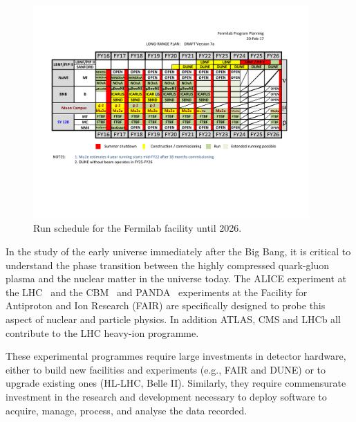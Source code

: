 \begin{figure}
\vspace*{0.3cm}
    \centering
    \includegraphics[width=0.94\textwidth]{10yr-PLAN-9Feb-2017-V7a.pdf}
    \caption{Run schedule for the Fermilab facility until 2026.}
    \label{fig:fnal-if}
\end{figure}

In the study of the early universe immediately after the Big Bang, it is
critical to understand the phase transition between the highly
compressed quark-gluon plasma and the nuclear matter in the universe
today. The ALICE experiment at the LHC~\cite{ALICE} and
the CBM~\cite{CBM} and PANDA~\cite{PANDA} experiments at the Facility for Antiproton and Ion
Research (FAIR) are specifically designed to probe this aspect of
nuclear and particle physics. In addition ATLAS, CMS and LHCb all
contribute to the LHC heavy-ion programme.

These experimental programmes require large investments in detector
hardware, either to build new facilities and experiments (e.g., FAIR and DUNE) or to upgrade existing ones (HL-LHC, Belle II). Similarly, they
require commensurate investment in the research and development
necessary to deploy software to acquire, manage, process, and analyse
the data recorded.

